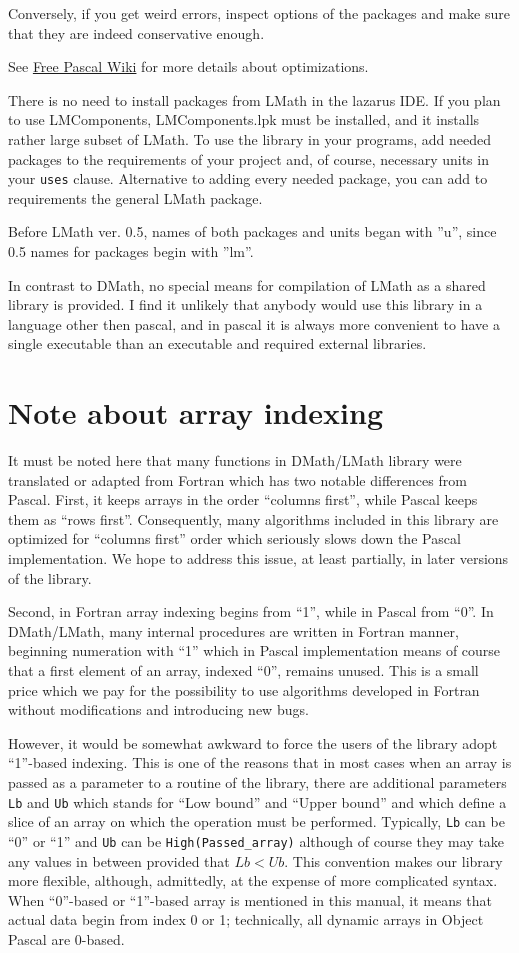 \documentclass[12pt,a4paper,oneside]{article}
\newcommand{\code}[1]{\texttt{#1}}
\begin{document}
Conversely, if you get weird errors, inspect options of the packages and make sure that they are indeed conservative enough.

See \href{https://wiki.freepascal.org/Optimization}{Free Pascal Wiki} for more details about optimizations.
 
There is no need to install packages from LMath in the lazarus IDE. If you plan to use LMComponents, LMComponents.lpk must be installed, and it installs rather large subset of LMath. To use the library in your programs, add needed packages to the requirements of your project and, of course, necessary units in your \code{uses} clause. Alternative to adding every needed package, you can add to requirements the general LMath package.

Before LMath ver. 0.5, names of both packages and units began with ''u'', since 0.5 names for packages begin with ''lm''. 

In contrast to DMath, no special means for compilation of LMath as a shared library is provided. I find it unlikely that anybody would use this library in a language other then pascal, and in pascal it is always more convenient to have a single executable than an executable and required external libraries.
\section{Note about array indexing}
It must be noted here that many functions in DMath/LMath library were translated or adapted from Fortran which has two notable differences from Pascal. First, it keeps arrays in the order ``columns first'', while Pascal keeps them as ``rows first''. Consequently, many algorithms included in this library are optimized for ``columns first'' order which seriously slows down the Pascal implementation. We hope to address this issue, at least partially, in later versions of the library.

Second, in Fortran array indexing begins from ``1'', while in Pascal from ``0''. In DMath/LMath, many internal procedures are written in Fortran manner, beginning numeration with ``1'' which in Pascal implementation means of course that a first element of an array, indexed ``0'', remains unused. This is a small price which we pay for the possibility to use algorithms developed in Fortran without modifications and introducing new bugs. 

However, it would be somewhat awkward to force the users of the library adopt ``1''-based indexing. This is one of the reasons that in most cases when an array is passed as a parameter to a routine of the library, there are additional parameters \code{Lb} and \code{Ub} which stands for ``Low bound'' and ``Upper bound'' and which define a slice of an array on which the operation must be performed. Typically, \code{Lb} can be ``0'' or ``1'' and \code{Ub} can be \code{High(Passed\_array)} although of course they may take any values in between provided that $Lb<Ub$. This convention makes our library more flexible, although, admittedly, at the expense of more complicated syntax. When ``0''-based or ``1''-based array is mentioned in this manual, it means that actual data begin from index 0 or 1; technically, all dynamic arrays in Object Pascal are 0-based.    
\end{document}
